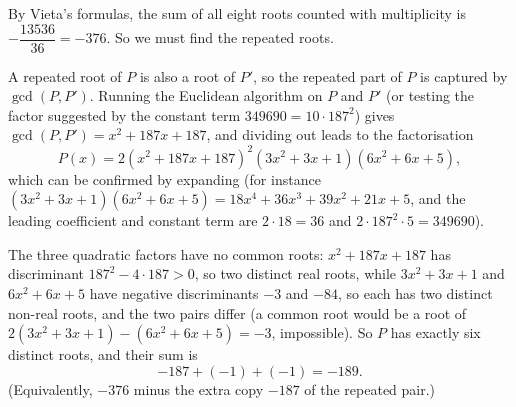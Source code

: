 By Vieta's formulas, the sum of all eight roots counted with multiplicity is $-\dfrac{13536}{36}=-376$. So we must find the repeated roots.

A repeated root of $P$ is also a root of $P'$, so the repeated part of $P$ is captured by $\gcd(P,P')$. Running the Euclidean algorithm on $P$ and $P'$ (or testing the factor suggested by the constant term $349690=10\cdot187^2$) gives $\gcd(P,P')=x^2+187x+187$, and dividing out leads to the factorisation
\[P(x)=2\left(x^2+187x+187\right)^2\left(3x^2+3x+1\right)\left(6x^2+6x+5\right),\]
which can be confirmed by expanding (for instance $\left(3x^2+3x+1\right)\left(6x^2+6x+5\right)=18x^4+36x^3+39x^2+21x+5$, and the leading coefficient and constant term are $2\cdot18=36$ and $2\cdot187^2\cdot5=349690$).

The three quadratic factors have no common roots: $x^2+187x+187$ has discriminant $187^2-4\cdot187>0$, so two distinct real roots, while $3x^2+3x+1$ and $6x^2+6x+5$ have negative discriminants $-3$ and $-84$, so each has two distinct non-real roots, and the two pairs differ (a common root would be a root of $2\left(3x^2+3x+1\right)-\left(6x^2+6x+5\right)=-3$, impossible). So $P$ has exactly six distinct roots, and their sum is
\[-187+(-1)+(-1)=\boxed{-189}.\]
(Equivalently, $-376$ minus the extra copy $-187$ of the repeated pair.)
